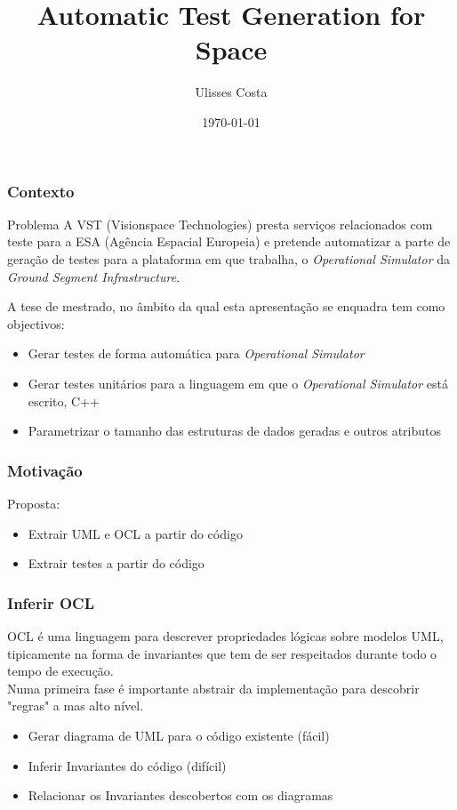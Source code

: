 \documentclass{beamer}
\title{Automatic Test Generation for Space}
\author{Ulisses Costa}
\date{\today}
\begin{document}
\begin{frame}
   \titlepage
\end{frame}

\begin{frame}\frametitle{Contexto}
\begin{block}{Problema}
A VST (Visionspace Technologies) presta serviços relacionados com teste para a ESA (Agência Espacial Europeia) e pretende automatizar
a parte de geração de testes para a plataforma em que trabalha, o \textit{Operational Simulator} da \textit{Ground Segment Infrastructure}.
\end{block}{}

A tese de mestrado, no âmbito da qual esta apresentação se enquadra tem como objectivos:
\begin{itemize}
\item Gerar testes de forma automática para \textit{Operational Simulator}
\item Gerar testes unitários para a linguagem em que o \textit{Operational Simulator} está escrito, C++
\item Parametrizar o tamanho das estruturas de dados geradas e outros atributos
\end{itemize}
\end{frame}

\begin{frame}\frametitle{Motivação}
Proposta:
\begin{itemize}
\item Extrair UML e OCL a partir do código
\item Extrair testes a partir do código
\end{itemize}
\end{frame}

\begin{frame}\frametitle{Inferir OCL}
OCL é uma linguagem para descrever propriedades lógicas sobre modelos UML, tipicamente na forma de invariantes que tem de ser respeitados durante todo o tempo de execução.\\

Numa primeira fase é importante abstrair da implementação para descobrir "regras" a mas alto nível.
\begin{itemize}
\item Gerar diagrama de UML para o código existente (fácil)
\item Inferir Invariantes do código (difícil)
\item Relacionar os Invariantes descobertos com os diagramas
\end{itemize}
\end{frame}
\end{document}
